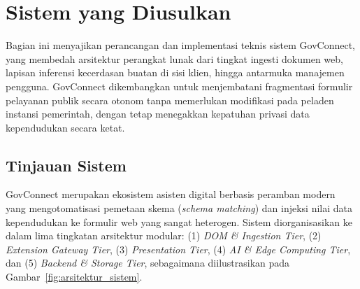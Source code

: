 \documentclass[conference]{IEEEtran}
\begin{document}
\section{Sistem yang Diusulkan}

Bagian ini menyajikan perancangan dan implementasi teknis sistem GovConnect, yang membedah arsitektur perangkat lunak dari tingkat ingesti dokumen web, lapisan inferensi kecerdasan buatan di sisi klien, hingga antarmuka manajemen pengguna. GovConnect dikembangkan untuk menjembatani fragmentasi formulir pelayanan publik secara otonom tanpa memerlukan modifikasi pada peladen instansi pemerintah, dengan tetap menegakkan kepatuhan privasi data kependudukan secara ketat.

\subsection{Tinjauan Sistem}
GovConnect merupakan ekosistem asisten digital berbasis peramban modern yang mengotomatisasi pemetaan skema (\textit{schema matching}) dan injeksi nilai data kependudukan ke formulir web yang sangat heterogen. Sistem diorganisasikan ke dalam lima tingkatan arsitektur modular: (1) \textit{DOM \& Ingestion Tier}, (2) \textit{Extension Gateway Tier}, (3) \textit{Presentation Tier}, (4) \textit{AI \& Edge Computing Tier}, dan (5) \textit{Backend \& Storage Tier}, sebagaimana diilustrasikan pada Gambar~\ref{fig:arsitektur_sistem}.
\end{document}
